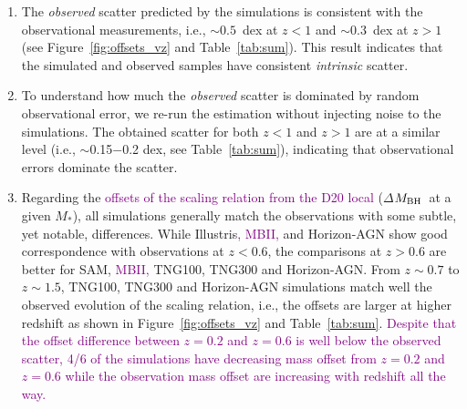 \documentclass[twocolumn]{aastex631}
\newcommand{\todo}[1]{\textcolor{red}{[{\bf TODO}: #1]}}
\newcommand{\red}[1]{\textcolor{purple}{#1}}
\def\smass{{$M_*$}}
\def\mbh{$M_{\rm BH}$}
\begin{document}
\begin{enumerate}

\item{}The {\it observed} scatter predicted by the simulations is consistent with the observational measurements, i.e., $\sim0.5$~dex at $z<1$ and $\sim0.3$~dex at $z>1$ (see Figure~\ref{fig:offsets_vz} and Table~\ref{tab:sum}). This result indicates that the simulated and observed samples have consistent {\it intrinsic} scatter.

\item{}To understand how much the {\it observed} scatter is dominated by random observational error,
we re-run the estimation without injecting noise to the simulations. The obtained scatter for both $z<1$ and $z>1$ are at a similar level (i.e.,  $\sim$0.15$-$0.2 dex, see Table~\ref{tab:sum}), indicating that observational errors dominate the scatter.

\item{} Regarding the \red{offsets of the scaling relation from the D20 local} ($\Delta$\mbh\ at a given \smass), all simulations generally match the observations with some subtle, yet notable, differences. While Illustris\red{, MBII,} and Horizon-AGN show good correspondence with observations at $z<0.6$, the comparisons at $z>0.6$ are better for SAM, \red{MBII,} TNG100, TNG300 and Horizon-AGN. From $z\sim0.7$ to $z\sim1.5$, TNG100, TNG300 and Horizon-AGN simulations match well the observed evolution of the scaling relation, i.e., the offsets are larger at higher redshift as shown in Figure~\ref{fig:offsets_vz} and Table~\ref{tab:sum}. 
\red{Despite that the offset difference between $z=0.2$ and $z=0.6$ is well below the observed scatter, 4/6 of the simulations have decreasing mass offset from $z=0.2$ and $z=0.6$ while the observation mass offset are increasing with redshift all the way.}
\end{enumerate}
\end{document}
